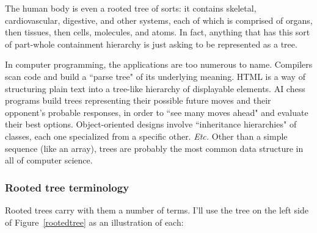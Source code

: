 The human body is even a rooted tree of sorts: it contains skeletal,
cardiovascular, digestive, and other systems, each of which is comprised of
organs, then tissues, then cells, molecules, and atoms. In fact, anything
that has this sort of part-whole containment hierarchy is just asking to be
represented as a tree.

In computer programming, the applications are too numerous to name.
Compilers scan code and build a ``parse tree" of its underlying meaning.
HTML is a way of structuring plain text into a tree-like hierarchy of
displayable elements. AI chess programs build trees representing their
possible future moves and their opponent's probable responses, in order to
``see many moves ahead" and evaluate their best options. Object-oriented
designs involve ``inheritance hierarchies" of classes, each one specialized
from a specific other. \textit{Etc.} Other than a simple sequence (like an
array), trees are probably the most common data structure in all of
computer science.

\subsubsection{Rooted tree terminology}

Rooted trees carry with them a number of terms. I'll use the tree on the
left side of Figure~\ref{rootedtree} as an illustration of each:


